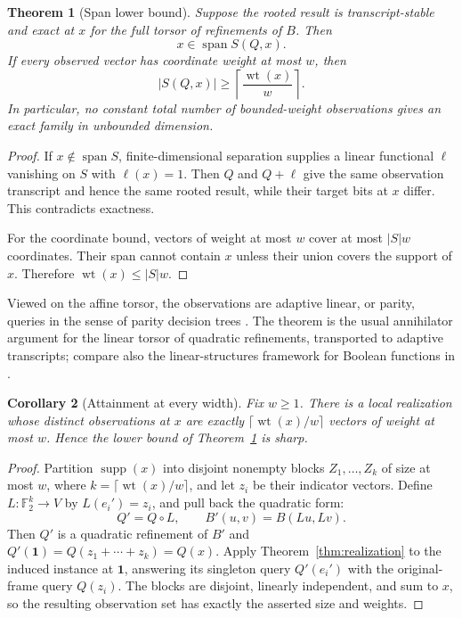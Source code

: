 \documentclass[11pt]{article}
\newtheorem{theorem}{Theorem}[section]
\newtheorem{corollary}[theorem]{Corollary}
\theoremstyle{definition}
\theoremstyle{remark}
\newcommand{\F}{\mathbb{F}}
\newcommand{\wt}{\operatorname{wt}}
\newcommand{\Span}{\operatorname{span}}
\begin{document}
\begin{theorem}[Span lower bound]\label{thm:span}
Suppose the rooted result is transcript-stable and exact at $x$ for the full
torsor of refinements of $B$.  Then
\[
  x\in\Span S(Q,x).
\]
If every observed vector has coordinate weight at most $w$, then
\[
  |S(Q,x)|\ge \left\lceil\frac{\wt(x)}{w}\right\rceil.
\]
In particular, no constant total number of bounded-weight observations gives
an exact family in unbounded dimension.
\end{theorem}

\begin{proof}
If $x\notin\Span S$, finite-dimensional separation supplies a linear
functional $\ell$ vanishing on $S$ with $\ell(x)=1$.  Then $Q$ and $Q+\ell$
give the same observation transcript and hence the same rooted result, while
their target bits at $x$ differ.  This contradicts exactness.

For the coordinate bound, vectors of weight at most $w$ cover at most
$|S|w$ coordinates.  Their span cannot contain $x$ unless their union covers
the support of $x$.  Therefore $\wt(x)\le |S|w$.
\end{proof}

Viewed on the affine torsor, the observations are adaptive linear, or parity,
queries in the sense of parity decision trees \cite{zhangshi2010}.  The
theorem is the usual annihilator argument for the linear torsor of quadratic
refinements, transported to adaptive transcripts; compare also the
linear-structures framework for Boolean functions in \cite{carlet2021}.

\begin{corollary}[Attainment at every width]\label{cor:block}
Fix $w\ge1$.  There is a local realization whose distinct observations at
$x$ are exactly
$\lceil\wt(x)/w\rceil$ vectors of weight at most $w$.  Hence the lower bound
of Theorem~\ref{thm:span} is sharp.
\end{corollary}

\begin{proof}
Partition $\operatorname{supp}(x)$ into disjoint nonempty blocks
$Z_1,\dots,Z_k$ of size at most $w$, where
$k=\lceil\wt(x)/w\rceil$, and let $z_i$ be their indicator vectors.  Define
$L:\F_2^k\to V$ by $L(e_i')=z_i$, and pull back the quadratic form:
\[
  Q'=Q\circ L,\qquad B'(u,v)=B(Lu,Lv).
\]
Then $Q'$ is a quadratic refinement of $B'$ and
$Q'(\mathbf 1)=Q(z_1+\cdots+z_k)=Q(x)$.  Apply
Theorem~\ref{thm:realization} to the induced instance at $\mathbf1$, answering
its singleton query $Q'(e_i')$ with the original-frame query $Q(z_i)$.  The
blocks are disjoint, linearly independent, and sum to $x$, so the resulting
observation set has exactly the asserted size and weights.
\end{proof}
\end{document}
